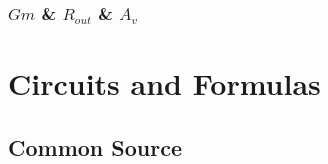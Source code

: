 \documentclass{beamer}
\begin{document}
\begin{frame}
    \frametitle{$Gm$ \& $R_{out}$ \& $A_v$}

    

\end{frame}

\section{Circuits and Formulas} %

\subsection{Common Source} %
\end{document}
